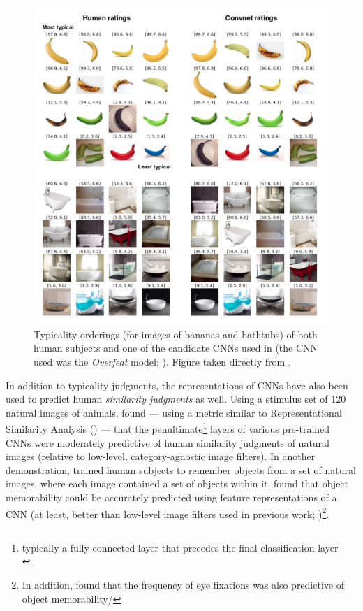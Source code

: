 \documentclass[12pt]{article}
\let\oldcite=\cite
\let\oldtextcite=\textcite
\renewcommand{\cite}[1]{\textcolor[rgb]{0, .121, .388}{\oldcite{#1}}}
\renewcommand{\textcite}[1]{\textcolor[rgb]{0, .121, .388}{\oldtextcite{#1}}}
\begin{document}
\begin{figure}[!h]
    \centering
    \includegraphics[scale=.7]{figures/lake2015deep.png}
    \caption{Typicality orderings (for images of bananas and bathtubs) of both human subjects and one of the candidate CNNs used in \textcite{lake2015deep} (the CNN used was the \emph{Overfeat} model; \cite{sermanet2013overfeat}). Figure taken directly from \textcite{lake2015deep}.}
    \label{fig:lake2015deep}
\end{figure} 

In addition to typicality judgments, the representations of CNNs have also been used to predict human \emph{similarity judgments} as well. Using a stimulus set of 120 natural images of animals, \textcite{peterson2016adapting} found --- using a metric similar to Representational Similarity Analysis (\cite{kriegeskorte2008representational}) --- that the penultimate\footnote{typically a fully-connected layer that precedes the final classification layer \\} layers of various pre-trained CNNs were moderately predictive of human similarity judgments of natural images (relative to low-level, category-agnostic image filters). In another demonstration, \textcite{dubey2015makes} trained human subjects to remember objects from a set of natural images, where each image contained a set of objects within it. \textcite{dubey2015makes} found that object memorability could be accurately predicted using feature representations of a CNN (at least, better than low-level image filters used in previous work; \cite{isola2013makes})\footnote{In addition, \textcite{dubey2015makes} found that the frequency of eye fixations was also predictive of object memorability/}.
\end{document}
